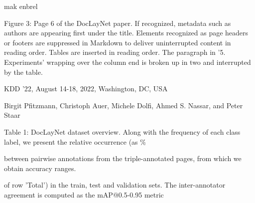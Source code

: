 \documentclass[11pt,a4paper]{article}
\begin{document}
mak enbrel

Figure 3: Page 6 of the DocLayNet paper. If recognized, metadata such as authors are appearing first under the title. Elements recognized as page headers or footers are suppressed in Markdown to deliver uninterrupted content in reading order. Tables are inserted in reading order. The paragraph in '5. Experiments' wrapping over the column end is broken up in two and interrupted by the table.

KDD '22, August 14-18, 2022, Washington, DC, USA

Birgit Pfitzmann, Christoph Auer, Michele Dolfi, Ahmed S. Nassar, and Peter Staar

Table 1: DocLayNet dataset overview. Along with the frequency of each class label, we present the relative occurrence (as \%

between pairwise annotations from the triple-annotated pages, from which we obtain accuracy ranges.

of row 'Total') in the train, test and validation sets. The inter-annotator agreement is computed as the mAP@0.5-0.95 metric

\begin{figure}[h]
% 
% 
\end{figure}

\begin{figure}[h]
\end{figure}
\end{document}
